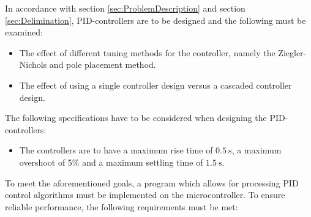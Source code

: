 \documentclass[../../main.tex]{subfiles}
\begin{document}
In accordance with section \ref{sec:ProblemDescription} and section \ref{sec:Delimination}, PID-controllers are to be designed and the following must be examined:
\begin{itemize}
    \item The effect of different tuning methods for the controller, namely the Ziegler-Nichols and pole placement method.
    \item The effect of using a single controller design versus a cascaded controller design.
\end{itemize}

The following specifications have to be considered when designing the PID-controllers:
\begin{itemize}
    \item The controllers are to have a maximum rise time of $\SI{0.5}{\second}$, a maximum overshoot of 5\% and a maximum settling time of $\SI{1.5}{\second}$.
\end{itemize}

To meet the aforementioned goals, a program which allows for processing PID control algorithms must be implemented on the microcontroller. To ensure reliable performance, the following requirements must be met:
\end{document}
